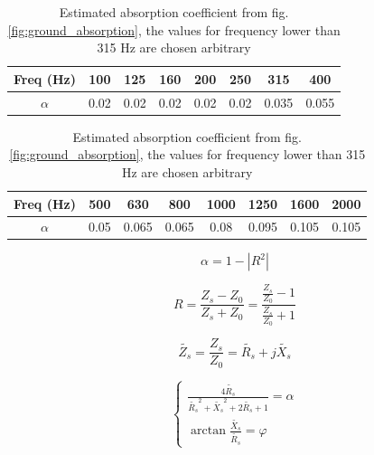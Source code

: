 \begin{table}[H]
	\caption{Estimated absorption coefficient from fig. \ref{fig:ground_absorption}, the values for frequency lower than 315 Hz are chosen arbitrary}
	\begin{tabular}{c|ccccccc}
		Freq (Hz)           & 100  & 125  & 160  & 200  & 250  & 315  & 400 \\ \hline
		$\alpha$ & 0.02 & 0.02 & 0.02 & 0.02 & 0.02 & 0.035 & 0.055
	\end{tabular}
	\newline
	\vspace*{10pt}
	\newline
	\begin{tabular}{c|ccccccc}
		Freq (Hz)  &  500  & 630  & 800  & 1000 & 1250 & 1600 & 2000 \\ \hline
		$\alpha$ & 0.05 & 0.065 & 0.065 & 0.08 & 0.095 & 0.105 & 0.105
	\end{tabular}
\end{table}

\begin{equation}
	\alpha = 1 - |R^2|
\end{equation}

\begin{equation}
	R = \frac{Z_s - Z_0}{Z_s + Z_0} = \frac{\frac{Z_s}{Z_0} - 1}{\frac{Z_s}{Z_0} + 1}
\end{equation}

\begin{equation}
	\tilde{Z_s} = \frac{Z_s}{Z_0} = \tilde{R_s} + j\tilde{X_s}
\end{equation}



\begin{equation}
	\begin{cases}
		\frac{4\tilde{R_s}}{\tilde{R_s}^2+\tilde{X_s}^2 + 2\tilde{R_s} + 1} = \alpha\\
		\arctan{\frac{\tilde{X_s}}{\tilde{R_s}}} = \varphi
	\end{cases}	
	\label{eq:impedance}
\end{equation}


